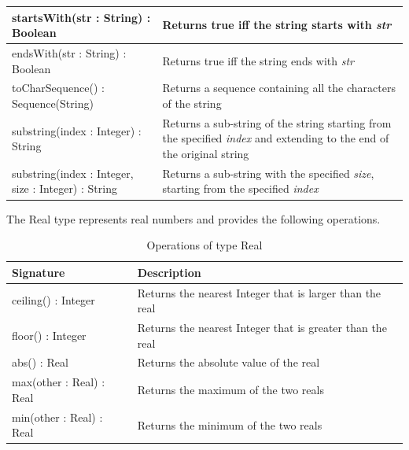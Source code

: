 \begin{longtable} {|p{5.5cm}|p{6.5cm}|}
			startsWith(str : String) : Boolean & Returns true iff the string starts with \emph{str}\\\hline
			
			endsWith(str : String) : Boolean & Returns true iff the string ends with \emph{str}\\\hline
			
			toCharSequence() : Sequence(String) & Returns a sequence containing all the characters of the string\\\hline
			
			substring(index : Integer) : String & Returns a sub-string of the string starting from the specified \emph{index} and extending to the end of the original string\\\hline
			
			substring(index : Integer, size : Integer) : String & Returns a sub-string with the specified \emph{size}, starting from the specified \emph{index} \\\hline
			
\end{longtable}

The Real type represents real numbers and provides the following operations.

\begin{longtable} {|p{5.5cm}|p{6.5cm}|}
			
			\caption{Operations of type Real}
			\label{tab:RealOperations}\\
			
			\hline
							
			\textbf{Signature} & \textbf{Description} \\\hline

			ceiling() : Integer & Returns the nearest Integer that is larger than the real\\\hline
			
			floor() : Integer & Returns the nearest Integer that is greater than the real\\\hline
			
			abs() : Real & Returns the absolute value of the real \\\hline
			
			max(other : Real) : Real & Returns the maximum of the two reals \\\hline
			
			min(other : Real) : Real & Returns the minimum of the two reals \\\hline
			
\end{longtable}


